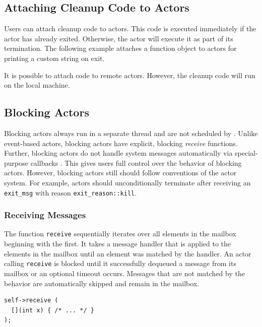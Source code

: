 

\subsection{Attaching Cleanup Code to Actors}
\label{attach}

Users can attach cleanup code to actors. This code is executed immediately if the actor has already exited. Otherwise, the actor will execute it as part of its termination. The following example attaches a function object to actors for printing a custom string on exit.



It is possible to attach code to remote actors. However, the cleanup code will run on the local machine.

\subsection{Blocking Actors}
\label{blocking-actor}

Blocking actors always run in a separate thread and are not scheduled by \lib. Unlike event-based actors, blocking actors have explicit, blocking \emph{receive} functions. Further, blocking actors do not handle system messages automatically via special-purpose callbacks . This gives users full control over the behavior of blocking actors. However, blocking actors still should follow conventions of the actor system. For example, actors should unconditionally terminate after receiving an \lstinline^exit_msg^ with reason \lstinline^exit_reason::kill^.

\subsubsection{Receiving Messages}

The function \lstinline^receive^ sequentially iterates over all elements in the mailbox beginning with the first.
It takes a message handler that is applied to the elements in the mailbox until an element was matched by the handler.
An actor calling \lstinline^receive^ is blocked until it successfully dequeued a message from its mailbox or an optional timeout occurs. Messages that are not matched by the behavior are automatically skipped and remain in the mailbox.

\begin{lstlisting}
self->receive (
  [](int x) { /* ... */ }
);
\end{lstlisting}

